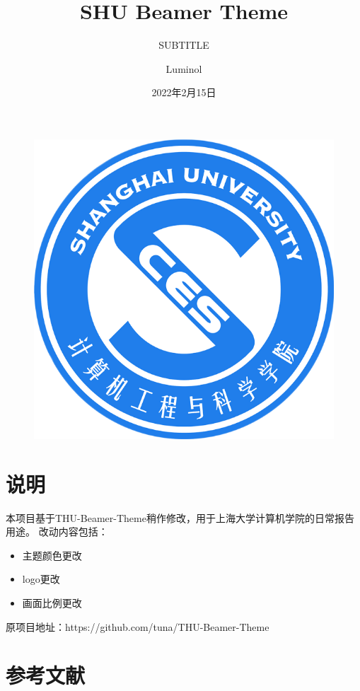 \documentclass{beamer}
\author{Luminol}
\title{SHU Beamer Theme}
\subtitle{SUBTITLE}
\institute{上海大学网络空间安全}
\date{2022年2月15日}
\begin{document}
\kaishu
\begin{frame}
    \titlepage
    \begin{figure}[htpb]
        \begin{center}
            \includegraphics[width=0.15\linewidth]{figures/ces-logo.png}
        \end{center}
    \end{figure}
\end{frame}

\begin{frame}
    \tableofcontents[sectionstyle=show,subsectionstyle=show/shaded/hide,subsubsectionstyle=show/shaded/hide]
\end{frame}

\section{说明}
\begin{frame}
    本项目基于THU-Beamer-Theme\cite{origin}稍作修改，用于上海大学计算机学院的日常报告用途。
    改动内容包括：
    \begin{itemize}
        \item 主题颜色更改
        \item logo更改
        \item 画面比例更改
    \end{itemize}
    原项目地址：https://github.com/tuna/THU-Beamer-Theme
\end{frame}

\section{参考文献}

\begin{frame}[allowframebreaks]
    
    
\end{frame}
\end{document}
